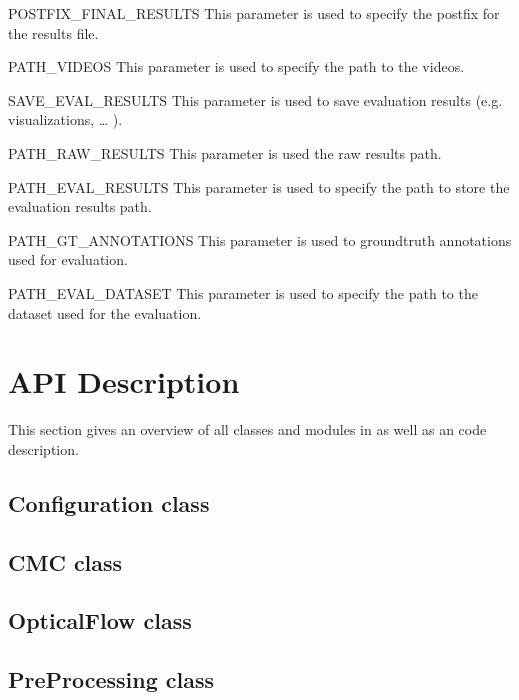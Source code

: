 \documentclass[letterpaper,10pt,english,openany,oneside]{sphinxmanual}
\begin{document}
POSTFIX\_FINAL\_RESULTS
This parameter is used to specify the postfix for the results file.



PATH\_VIDEOS
This parameter is used to specify the path to the videos.



SAVE\_EVAL\_RESULTS
This parameter is used to save evaluation results (e.g. visualizations, … ).



PATH\_RAW\_RESULTS
This parameter is used the raw results path.



PATH\_EVAL\_RESULTS
This parameter is used to specify the path to store the evaluation results path.



PATH\_GT\_ANNOTATIONS
This parameter is used to groundtruth annotations used for evaluation.



PATH\_EVAL\_DATASET
This parameter is used to specify the path to the dataset used for the evaluation.




\chapter{API Description}
\label{\detokenize{index:api-description}}
This section gives an overview of all classes and modules in  as well as an code description.


\section{Configuration class}
\label{\detokenize{Configuration:configuration-class}}\label{\detokenize{Configuration::doc}}

\section{CMC class}
\label{\detokenize{CMC:cmc-class}}\label{\detokenize{CMC::doc}}

\section{OpticalFlow class}
\label{\detokenize{OpticalFlow:opticalflow-class}}\label{\detokenize{OpticalFlow::doc}}

\section{PreProcessing class}
\label{\detokenize{PreProcessing:preprocessing-class}}\label{\detokenize{PreProcessing::doc}}
\end{document}
